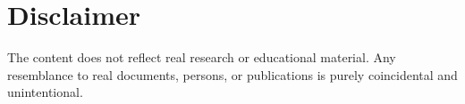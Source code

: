 \section{Disclaimer}
The content does not reflect real research or educational material. Any resemblance to real documents, persons, or publications is purely coincidental and unintentional.
